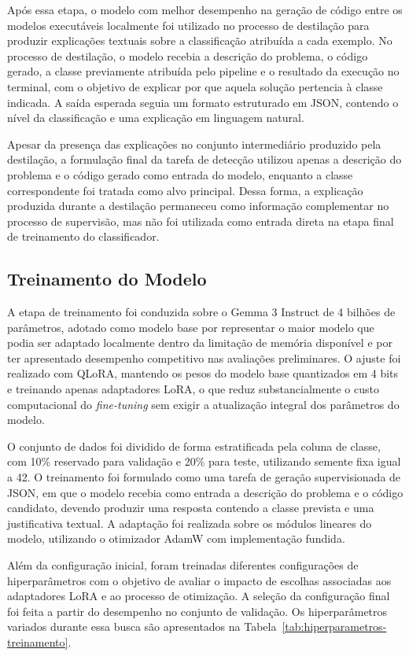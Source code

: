 \documentclass[conference]{IEEEtran}
\begin{document}
Após essa etapa, o modelo com melhor desempenho na geração de código entre os modelos executáveis localmente foi utilizado no processo de destilação para produzir explicações textuais sobre a classificação atribuída a cada exemplo. No processo de destilação, o modelo recebia a descrição do problema, o código gerado, a classe previamente atribuída pelo pipeline e o resultado da execução no terminal, com o objetivo de explicar por que aquela solução pertencia à classe indicada. A saída esperada seguia um formato estruturado em JSON, contendo o nível da classificação e uma explicação em linguagem natural.

Apesar da presença das explicações no conjunto intermediário produzido pela destilação, a formulação final da tarefa de detecção utilizou apenas a descrição do problema e o código gerado como entrada do modelo, enquanto a classe correspondente foi tratada como alvo principal. Dessa forma, a explicação produzida durante a destilação permaneceu como informação complementar no processo de supervisão, mas não foi utilizada como entrada direta na etapa final de treinamento do classificador.

\subsection{Treinamento do Modelo}

A etapa de treinamento foi conduzida sobre o Gemma 3 Instruct de 4 bilhões de parâmetros, adotado como modelo base por representar o maior modelo que podia ser adaptado localmente dentro da limitação de memória disponível e por ter apresentado desempenho competitivo nas avaliações preliminares. O ajuste foi realizado com QLoRA, mantendo os pesos do modelo base quantizados em 4 bits e treinando apenas adaptadores LoRA, o que reduz substancialmente o custo computacional do \textit{fine-tuning} sem exigir a atualização integral dos parâmetros do modelo.

O conjunto de dados foi dividido de forma estratificada pela coluna de classe, com 10\% reservado para validação e 20\% para teste, utilizando semente fixa igual a 42. O treinamento foi formulado como uma tarefa de geração supervisionada de JSON, em que o modelo recebia como entrada a descrição do problema e o código candidato, devendo produzir uma resposta contendo a classe prevista e uma justificativa textual. A adaptação foi realizada sobre os módulos lineares do modelo, utilizando o otimizador AdamW com implementação fundida.

Além da configuração inicial, foram treinadas diferentes configurações de hiperparâmetros com o objetivo de avaliar o impacto de escolhas associadas aos adaptadores LoRA e ao processo de otimização. A seleção da configuração final foi feita a partir do desempenho no conjunto de validação. Os hiperparâmetros variados durante essa busca são apresentados na Tabela~\ref{tab:hiperparametros-treinamento}.
\end{document}
